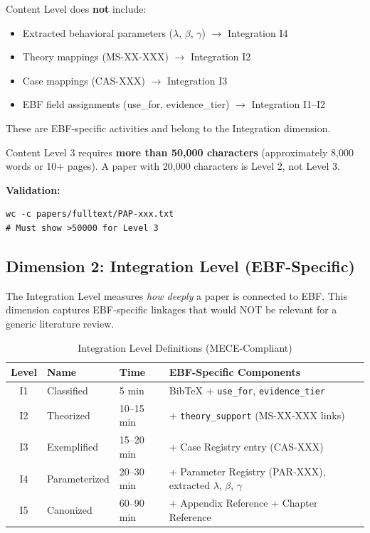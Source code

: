 \begin{tcolorbox}[colback=yellow!5!white, colframe=yellow!75!black,
    title=Note: What Content Level Does NOT Include]
Content Level does \textbf{not} include:
\begin{itemize}[nosep]
    \item Extracted behavioral parameters ($\lambda$, $\beta$, $\gamma$) $\rightarrow$ Integration I4
    \item Theory mappings (MS-XX-XXX) $\rightarrow$ Integration I2
    \item Case mappings (CAS-XXX) $\rightarrow$ Integration I3
    \item EBF field assignments (use\_for, evidence\_tier) $\rightarrow$ Integration I1--I2
\end{itemize}
These are EBF-specific activities and belong to the Integration dimension.
\end{tcolorbox}

\begin{tcolorbox}[colback=red!5!white, colframe=red!75!black,
    title=Critical: Content Level 3 Threshold]
Content Level 3 requires \textbf{more than 50,000 characters} (approximately
8,000 words or 10+ pages). A paper with 20,000 characters is Level 2, not Level 3.

\textbf{Validation:}
\begin{verbatim}
wc -c papers/fulltext/PAP-xxx.txt
# Must show >50000 for Level 3
\end{verbatim}
\end{tcolorbox}

\subsection{Dimension 2: Integration Level (EBF-Specific)}

The Integration Level measures \textit{how deeply} a paper is connected to EBF.
This dimension captures EBF-specific linkages that would NOT be relevant for a generic literature review.

\begin{table}[htbp]
\centering
\caption{Integration Level Definitions (MECE-Compliant)}
\label{tab:integration-levels}
\renewcommand{\arraystretch}{1.3}
\begin{tabular}{@{}cllp{5.5cm}@{}}
\toprule
\textbf{Level} & \textbf{Name} & \textbf{Time} & \textbf{EBF-Specific Components} \\
\midrule
I1 & Classified & 5 min & BibTeX + \texttt{use\_for}, \texttt{evidence\_tier} \\
I2 & Theorized & 10--15 min & + \texttt{theory\_support} (MS-XX-XXX links) \\
I3 & Exemplified & 15--20 min & + Case Registry entry (CAS-XXX) \\
I4 & Parameterized & 20--30 min & + Parameter Registry (PAR-XXX), extracted $\lambda$, $\beta$, $\gamma$ \\
I5 & Canonized & 60--90 min & + Appendix Reference + Chapter Reference \\
\bottomrule
\end{tabular}
\end{table}

